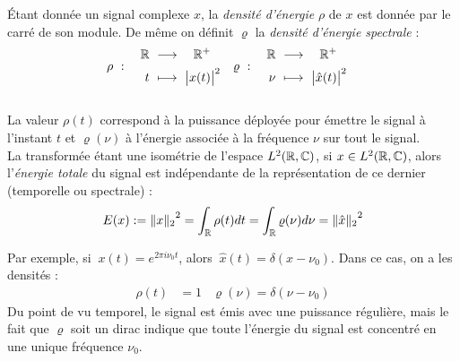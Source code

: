 \begin{definition}\label{def:densi_dE}
	Étant donnée un signal complexe $x$, la \emph{densité d'énergie} $\rho$ de $x$ est donnée par le carré de son module. De même on définit $\varrho$ la \emph{densité d'énergie spectrale} :
	\begin{equation}\label{eq:densi_dE}
		\begin{aligned}
			\rho\ &:\quad \begin{aligned}\mathbb{R}\ &\longrightarrow\quad \mathbb{R}^+ \\ t\ &\longmapsto\ \big|x(t)\big|^2 \end{aligned}  &
			\varrho\ &:\quad \begin{aligned}\mathbb{R}\ &\longrightarrow\quad \mathbb{R}^+ \\ \nu\ &\longmapsto\ \big|\hat{x}(t)\big|^2 \end{aligned}
		\end{aligned}
	\end{equation}
	\\
	La valeur $\rho(t)$ correspond à la puissance déployée pour émettre le signal à l'instant $t$ et $\varrho(\nu)$ à l'énergie associée à la fréquence $\nu$ sur tout le signal. 
	\\
	La transformée étant une isométrie de l'espace $L^2(\mathbb{R},\mathbb{C})$, si $x\in L^2(\mathbb{R},\mathbb{C})$, alors l'\emph{énergie totale} du signal est indépendante de la représentation de ce dernier (temporelle ou spectrale) :
	\begin{equation}\label{eq:parceval}
		E(x) := {\|x\|_2}^2 = \int_{\mathbb{R}} \rho(t) dt = \int_{\mathbb{R}} \varrho(\nu) d\nu = {\|\hat{x}\|_2}^2
	\end{equation}
\end{definition}

Par exemple, si $\ x(t)=e^{2\pi i\nu_0 t}$, alors $\ \hat{x}(t) = \delta(x-\nu_0)$. Dans ce cas, on a les densités :
\begin{align*}
	\rho(t) &= 1  &  \varrho(\nu) = \delta(\nu-\nu_0)
\end{align*}
Du point de vu temporel, le signal est émis avec une puissance régulière, mais le fait que $\varrho$ soit un dirac indique que toute l'énergie du signal est concentré en une unique fréquence $\nu_0$.
\\ \\

